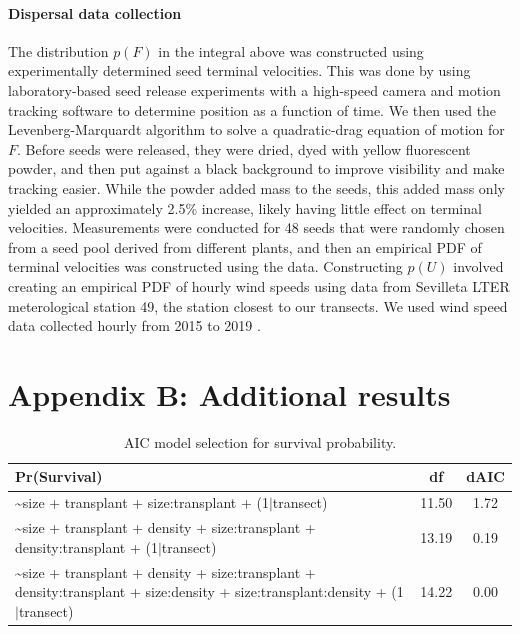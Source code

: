 \documentclass[11pt]{article}\usepackage[]{graphicx}\usepackage[usenames,dvipsnames]{xcolor}
\begin{document}
\paragraph{Dispersal data collection}
The distribution $p(F)$ in the integral above was constructed using experimentally determined seed terminal velocities.
This was done by using laboratory-based seed release experiments with a high-speed camera and motion tracking software to determine position as a function of time.
We then used the Levenberg-Marquardt algorithm to solve a quadratic-drag equation of motion for $F$. 
Before seeds were released, they were dried, dyed with yellow fluorescent powder, and then put against a black background to improve visibility and make tracking easier.
While the powder added mass to the seeds, this added mass only yielded an approximately 2.5\% increase, likely having little effect on terminal velocities.
Measurements were conducted for 48 seeds that were randomly chosen from a seed pool derived from different plants, and then an empirical PDF of terminal velocities was constructed using the data.
Constructing $p(U)$ involved creating an empirical PDF of hourly wind speeds using data from Sevilleta LTER meterological station 49, the station closest to our transects.
We used wind speed data collected hourly from 2015 to 2019 \citep{SEVmet}.

\newpage
\section*{Appendix B: Additional results}
\renewcommand{\thefigure}{B\arabic{figure}}\setcounter{figure}{0}
\renewcommand{\thetable}{B\arabic{table}}\setcounter{table}{0}
\renewcommand{\theequation}{B\arabic{equation}}\setcounter{equation}{0}

\begin{table}[ht]
\centering
\begin{tabular}{|p{12cm}|c|c|}
  \hline
Pr(Survival) & df & dAIC \\ 
  \hline
\~{}size + transplant + size:transplant + (1$|$transect) & 11.50 & 1.72 \\ 
  \~{}size + transplant + density + size:transplant + density:transplant + (1$|$transect) & 13.19 & 0.19 \\ 
  \~{}size + transplant + density + size:transplant + density:transplant + size:density + size:transplant:density + (1$|$transect) & 14.22 & 0.00 \\ 
   \hline
\end{tabular}
\caption{AIC model selection for survival probability.} 
\label{tab:surv_aic}
\end{table}
\end{document}
